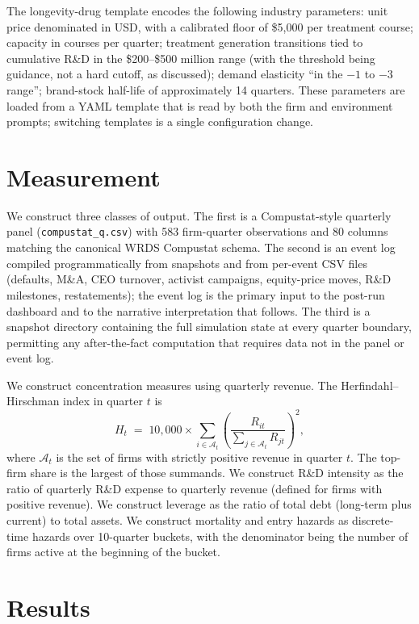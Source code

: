 \documentclass[11pt]{article}
\begin{document}
The longevity-drug template encodes the following industry parameters:
unit price denominated in USD, with a calibrated floor of \$5{,}000
per treatment course; capacity in courses per quarter; treatment
generation transitions tied to cumulative R\&D in the
\$200--\$500 million range (with the threshold being guidance, not a
hard cutoff, as discussed); demand elasticity ``in the $-1$ to $-3$
range''; brand-stock half-life of approximately 14 quarters. These
parameters are loaded from a YAML template that is read by both the
firm and environment prompts; switching templates is a single
configuration change.

\section{Measurement}\label{sec:measurement}

We construct three classes of output. The first is a Compustat-style
quarterly panel (\texttt{compustat\_q.csv}) with 583 firm-quarter
observations and 80 columns matching the canonical WRDS Compustat
schema. The second is an event log compiled programmatically from
snapshots and from per-event CSV files (defaults, M\&A, CEO turnover,
activist campaigns, equity-price moves, R\&D milestones, restatements);
the event log is the primary input to the post-run dashboard and to the
narrative interpretation that follows. The third is a snapshot directory
containing the full simulation state at every quarter boundary,
permitting any after-the-fact computation that requires data not in the
panel or event log.

We construct concentration measures using quarterly revenue. The
Herfindahl--Hirschman index in quarter $t$ is
\[
H_t \;=\; 10{,}000 \times \sum_{i \in \mathcal{A}_t}
  \left(\frac{R_{it}}{\sum_{j\in\mathcal{A}_t} R_{jt}}\right)^{\!2},
\]
where $\mathcal{A}_t$ is the set of firms with strictly positive revenue
in quarter $t$. The top-firm share is the largest of those summands. We
construct R\&D intensity as the ratio of quarterly R\&D expense to
quarterly revenue (defined for firms with positive revenue). We
construct leverage as the ratio of total debt (long-term plus current)
to total assets. We construct mortality and entry hazards as discrete-
time hazards over 10-quarter buckets, with the denominator being the
number of firms active at the beginning of the bucket.

\section{Results}\label{sec:results}
\end{document}
